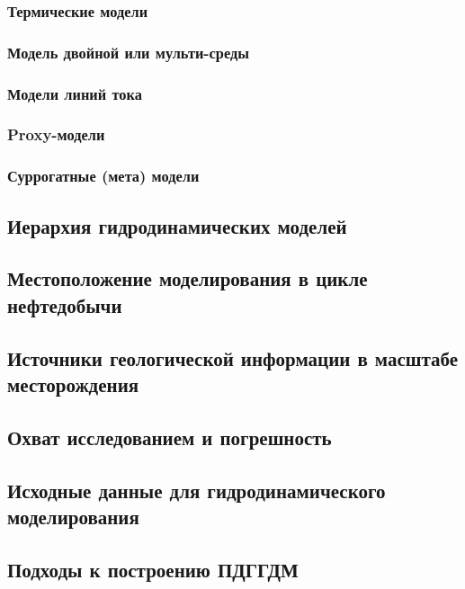 \documentclass[main.tex]{subfiles}
\begin{document}
\subsubsection{Термические модели}

\subsubsection{Модель двойной или мульти-среды}

\subsubsection{Модели линий тока}

\subsubsection{Proxy-модели}

\subsubsection{Суррогатные (мета) модели}

\subsection{Иерархия гидродинамических моделей}

\subsection{Местоположение моделирования в цикле нефтедобычи}

\subsection{Источники геологической информации в масштабе месторождения}

\subsection{Охват исследованием и погрешность}

\subsection{Исходные данные для гидродинамического моделирования}

\subsection{Подходы к построению ПДГГДМ}
\end{document}
